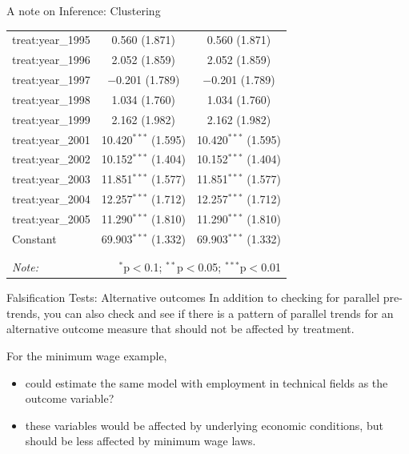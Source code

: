 \documentclass[
  ignorenonframetext,
]{beamer}
\begin{document}
\begin{frame}[fragile]{A note on Inference: Clustering}
\begin{table}[!htbp]
\begin{tabular}{@{\extracolsep{5pt}}lcc}
  treat:year\_1995 & 0.560 (1.871) & 0.560 (1.871) \\ 
  treat:year\_1996 & 2.052 (1.859) & 2.052 (1.859) \\ 
  treat:year\_1997 & $-$0.201 (1.789) & $-$0.201 (1.789) \\ 
  treat:year\_1998 & 1.034 (1.760) & 1.034 (1.760) \\ 
  treat:year\_1999 & 2.162 (1.982) & 2.162 (1.982) \\ 
  treat:year\_2001 & 10.420$^{***}$ (1.595) & 10.420$^{***}$ (1.595) \\ 
  treat:year\_2002 & 10.152$^{***}$ (1.404) & 10.152$^{***}$ (1.404) \\ 
  treat:year\_2003 & 11.851$^{***}$ (1.577) & 11.851$^{***}$ (1.577) \\ 
  treat:year\_2004 & 12.257$^{***}$ (1.712) & 12.257$^{***}$ (1.712) \\ 
  treat:year\_2005 & 11.290$^{***}$ (1.810) & 11.290$^{***}$ (1.810) \\ 
  Constant & 69.903$^{***}$ (1.332) & 69.903$^{***}$ (1.332) \\ 
 \hline \\[-1.8ex] 
\hline 
\hline \\[-1.8ex] 
\textit{Note:}  & \multicolumn{2}{r}{$^{*}$p$<$0.1; $^{**}$p$<$0.05; $^{***}$p$<$0.01} \\ 
\end{tabular} 
\end{table}
\end{frame}

\begin{frame}{Falsification Tests: Alternative outcomes}
\protect\hypertarget{falsification-tests-alternative-outcomes}{}
In addition to checking for parallel pre-trends, you can also check and
see if there is a pattern of parallel trends for an alternative outcome
measure that should not be affected by treatment.

For the minimum wage example,

\begin{itemize}
\item
  could estimate the same model with employment in technical fields as
  the outcome variable?
\item
  these variables would be affected by underlying economic conditions,
  but should be less affected by minimum wage laws.
\end{itemize}
\end{frame}
\end{document}
